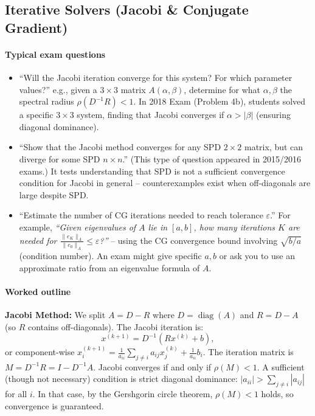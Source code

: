 \documentclass[a4paper,11pt]{article}
\begin{document}
\subsection{Iterative Solvers (Jacobi \& Conjugate Gradient)}
\paragraph{Typical exam questions}
\begin{itemize}
    \item \enquote{Will the Jacobi iteration converge for this system? For which parameter values?} e.g., given a $3\times3$ matrix $A(\alpha,\beta)$, determine for what $\alpha,\beta$ the spectral radius $\rho(D^{-1}R)<1$. In 2018 Exam (Problem 4b), students solved a specific $3\times3$ system, finding that Jacobi converges if $\alpha > |\beta|$ (ensuring diagonal dominance).
    \item \enquote{Show that the Jacobi method converges for any SPD $2\times2$ matrix, but can diverge for some SPD $n\times n$.} (This type of question appeared in 2015/2016 exams.) It tests understanding that SPD is not a sufficient convergence condition for Jacobi in general -- counterexamples exist when off-diagonals are large despite SPD.
    \item \enquote{Estimate the number of CG iterations needed to reach tolerance $\varepsilon$.} For example, \textit{``Given eigenvalues of $A$ lie in $[a,b]$, how many iterations $K$ are needed for $\frac{\|e_K\|_A}{\|e_0\|_A}\le \varepsilon$?''} -- using the CG convergence bound involving $\sqrt{b/a}$ (condition number). An exam might give specific $a,b$ or ask you to use an approximate ratio from an eigenvalue formula of $A$.
\end{itemize}

\paragraph{Worked outline}
\textbf{Jacobi Method:} We split $A = D - R$ where $D=\operatorname{diag}(A)$ and $R = D - A$ (so $R$ contains off-diagonals). The Jacobi iteration is:
\[ x^{(k+1)} = D^{-1}(R x^{(k)} + b), \]
or component-wise $x_i^{(k+1)} = \frac{1}{a_{ii}}\sum_{j\neq i} a_{ij}x_j^{(k)} + \frac{1}{a_{ii}}b_i$. The iteration matrix is $M = D^{-1}R = I - D^{-1}A$. Jacobi converges if and only if $\rho(M)<1$. A sufficient (though not necessary) condition is strict diagonal dominance: $|a_{ii}| > \sum_{j\neq i}|a_{ij}|$ for all $i$. In that case, by the Gershgorin circle theorem, $\rho(M)<1$ holds, so convergence is guaranteed.
\end{document}
